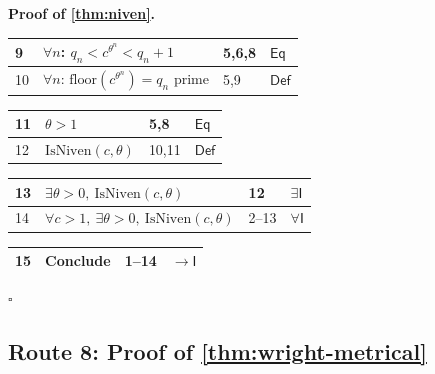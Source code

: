 \documentclass[11pt,reqno]{amsart}
\theoremstyle{blueplain}
\renewcommand{\qedsymbol}{\textcolor{proofqed}{\ensuremath{\square}}}
\renewenvironment{proof}[1][Proof]{\par\noindent\textbf{\textcolor{proofhead}{#1.}}\par\nobreak}{\par\nobreak\hfill\qedsymbol}
\numberwithin{equation}{section}
\begin{document}
\begin{proof}[\textbf{Proof of \cref{thm:niven}}]
{\begin{tabular}{|m{0.7cm}|m{12cm}|m{1.4cm}|m{2.5cm}|}
\hline
9 & $\forall n$: $q_n<c^{\theta^n}<q_n+1$ & 5,6,8 & $\mathsf{Eq}$ \\ \hline
10 & $\forall n$: $\mathrm{floor}(c^{\theta^n})=q_n$ prime & 5,9 & $\mathsf{Def}$ \\
\end{tabular}%
\noindent \newline
\noindent
\begin{tabular}{|m{0.7cm}|m{12cm}|m{1.4cm}|m{2.5cm}|}
\hline
11 & $\theta>1$ & 5,8 & $\mathsf{Eq}$ \\ \hline
12 & $\mathrm{IsNiven}(c,\theta)$ & 10,11 & $\mathsf{Def}$ \\
\end{tabular}%
\noindent \newline
\noindent
\begin{tabular}{|m{0.7cm}|m{12cm}|m{1.4cm}|m{2.5cm}|}
\hline
13 & $\exists\theta>0,\ \mathrm{IsNiven}(c,\theta)$ & 12 & $\exists\mathsf{I}$ \\ \hline
14 & $\forall c>1,\ \exists\theta>0,\ \mathrm{IsNiven}(c,\theta)$ & 2--13 & $\forall\mathsf{I}$ \\
\end{tabular}%
\noindent \newline
\noindent
\begin{tabular}{|m{0.7cm}|m{12cm}|m{1.4cm}|m{2.5cm}|}
\hline
15 & Conclude & 1--14 & $\rightarrow\mathsf{I}$ \\ \hline
\end{tabular}%
}
\end{proof}

\subsection{Route 8: Proof of \cref{thm:wright-metrical}}
\end{document}

